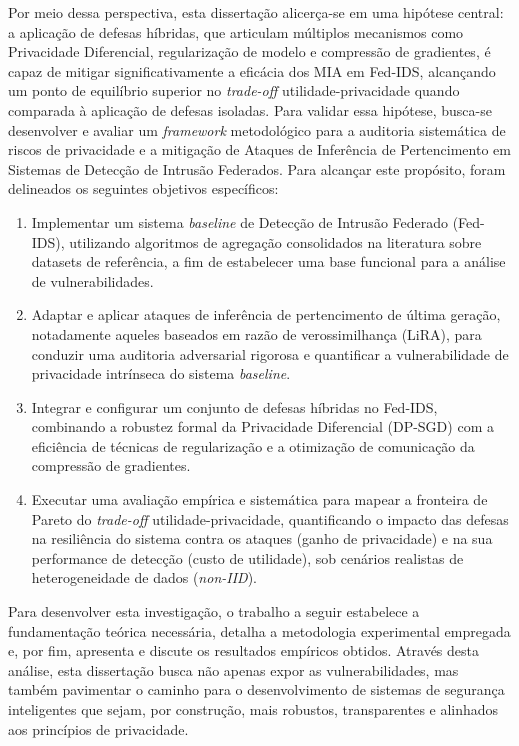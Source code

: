 \documentclass[
	12pt,				%
	openright,			%
	oneside,			%
	a4paper,			%
	english,			%
	french,				%
	spanish,			%
	brazil,				%
	]{abntex2}
\begin{document}
Por meio dessa perspectiva, esta dissertação alicerça-se em uma hipótese central: a aplicação de defesas híbridas, que articulam múltiplos mecanismos como Privacidade Diferencial, regularização de modelo e compressão de gradientes, é capaz de mitigar significativamente a eficácia dos MIA em Fed-IDS, alcançando um ponto de equilíbrio superior no \textit{trade-off} utilidade-privacidade quando comparada à aplicação de defesas isoladas. Para validar essa hipótese, busca-se desenvolver e avaliar um \textit{framework} metodológico para a auditoria sistemática de riscos de privacidade e a mitigação de Ataques de Inferência de Pertencimento em Sistemas de Detecção de Intrusão Federados. Para alcançar este propósito, foram delineados os seguintes objetivos específicos:
\begin{enumerate}
    \item Implementar um sistema \textit{baseline} de Detecção de Intrusão Federado (Fed-IDS), utilizando algoritmos de agregação consolidados na literatura sobre datasets de referência, a fim de estabelecer uma base funcional para a análise de vulnerabilidades.

    \item Adaptar e aplicar ataques de inferência de pertencimento de última geração, notadamente aqueles baseados em razão de verossimilhança (LiRA), para conduzir uma auditoria adversarial rigorosa e quantificar a vulnerabilidade de privacidade intrínseca do sistema \textit{baseline}.

    \item Integrar e configurar um conjunto de defesas híbridas no Fed-IDS, combinando a robustez formal da Privacidade Diferencial (DP-SGD) com a eficiência de técnicas de regularização e a otimização de comunicação da compressão de gradientes.
    
    \item Executar uma avaliação empírica e sistemática para mapear a fronteira de Pareto do \textit{trade-off} utilidade-privacidade, quantificando o impacto das defesas na resiliência do sistema contra os ataques (ganho de privacidade) e na sua performance de detecção (custo de utilidade), sob cenários realistas de heterogeneidade de dados (\textit{non-IID}).
\end{enumerate}

Para desenvolver esta investigação, o trabalho a seguir estabelece a fundamentação teórica necessária, detalha a metodologia experimental empregada e, por fim, apresenta e discute os resultados empíricos obtidos. Através desta análise, esta dissertação busca não apenas expor as vulnerabilidades, mas também pavimentar o caminho para o desenvolvimento de sistemas de segurança inteligentes que sejam, por construção, mais robustos, transparentes e alinhados aos princípios de privacidade.
\end{document}
